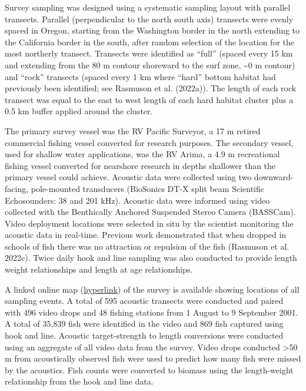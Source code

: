\documentclass[11pt,
  english,
  letterpaper,
]{article}
\begin{document}
Survey sampling was designed using a systematic sampling layout with parallel transects. Parallel (perpendicular to the north south axis) transects were evenly spaced in Oregon, starting from the Washington border in the north extending to the California border in the south, after random selection of the location for the most northerly transect. Transects were identified as ``full'' (spaced every 15 km and extending from the 80 m contour shoreward to the surf zone, \textasciitilde0 m contour) and ``rock'' transects (spaced every 1 km where ``hard'' bottom habitat had previously been identified; see Rasmuson et al. (2022a)). The length of each rock transect was equal to the east to west length of each hard habitat cluster plus a 0.5 km buffer applied around the cluster.

The primary survey vessel was the RV Pacific Surveyor, a 17 m retired commercial fishing vessel converted for research purposes. The secondary vessel, used for shallow water applications, was the RV Arima, a 4.9 m recreational fishing vessel converted for nearshore research in depths shallower than the primary vessel could achieve. Acoustic data were collected using two downward-facing, pole-mounted transducers (BioSonics DT-X split beam Scientific Echosounders: 38 and 201 kHz). Acoustic data were informed using video collected with the Benthically Anchored Suspended Stereo Camera (BASSCam). Video deployment locations were selected in situ by the scientist monitoring the acoustic data in real-time. Previous work demonstrated that when dropped in schools of fish there was no attraction or repulsion of the fish (Rasmuson et al. 2022c). Twice daily hook and line sampling was also conducted to provide length weight relationships and length at age relationships.

A linked online map (\href{https://www.arcgis.com/apps/mapviewer/index.html?webmap=49e8f3a8079448c29a21d4384d2b50dd}{hyperlink}) of the survey is available showing locations of all sampling events. A total of 595 acoustic transects were conducted and paired with 496 video drops and 48 fishing stations from 1 August to 9 September 2001. A total of 35,839 fish were identified in the video and 869 fish captured using hook and line. Acoustic target-strength to length conversions were conducted using an aggregate of all video data from the survey. Video drops conducted \textgreater50 m from acoustically observed fish were used to predict how many fish were missed by the acoustics. Fish counts were converted to biomass using the length-weight relationship from the hook and line data.
\end{document}
